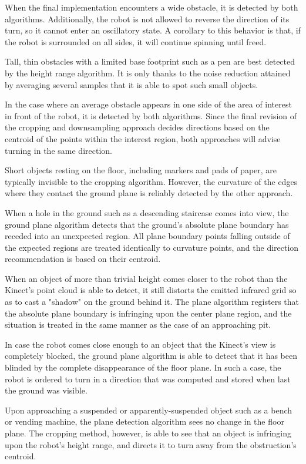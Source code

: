 \documentclass[12pt]{report}
\begin{document}
When the final implementation encounters a wide obstacle, it is detected by both algorithms.  Additionally, the robot is not allowed to reverse the direction of its turn, so it cannot enter an oscillatory state.  A corollary to this behavior is that, if the robot is surrounded on all sides, it will continue spinning until freed.

Tall, thin obstacles with a limited base footprint such as a pen are best detected by the height range algorithm.  It is only thanks to the noise reduction attained by averaging several samples that it is able to spot such small objects.

In the case where an average obstacle appears in one side of the area of interest in front of the robot, it is detected by both algorithms.  Since the final revision of the cropping and downsampling approach decides directions based on the centroid of the points within the interest region, both approaches will advise turning in the same direction.

Short objects resting on the floor, including markers and pads of paper, are typically invisible to the cropping algorithm.  However, the curvature of the edges where they contact the ground plane is reliably detected by the other approach.

When a hole in the ground such as a descending staircase comes into view, the ground plane algorithm detects that the ground's absolute plane boundary has receded into an unexpected region.  All plane boundary points falling outside of the expected regions are treated identically to curvature points, and the direction recommendation is based on their centroid.

When an object of more than trivial height comes closer to the robot than the Kinect's point cloud is able to detect, it still distorts the emitted infrared grid so as to cast a "shadow" on the ground behind it.  The plane algorithm registers that the absolute plane boundary is infringing upon the center plane region, and the situation is treated in the same manner as the case of an approaching pit.

In case the robot comes close enough to an object that the Kinect's view is completely blocked, the ground plane algorithm is able to detect that it has been blinded by the complete disappearance of the floor plane.  In such a case, the robot is ordered to turn in a direction that was computed and stored when last the ground was visible.

Upon approaching a suspended or apparently-suspended object such as a bench or vending machine, the plane detection algorithm sees no change in the floor plane.  The cropping method, however, is able to see that an object is infringing upon the robot's height range, and directs it to turn away from the obstruction's centroid.
\end{document}
